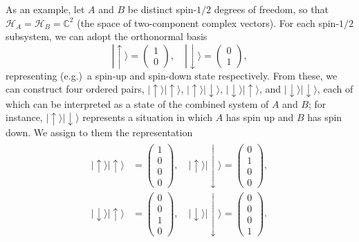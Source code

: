 \documentclass[prx,12pt]{revtex4-2}
\begin{document}
As an example, let $A$ and $B$ be distinct spin-$1/2$ degrees of
freedom, so that $\mathscr{H}_A = \mathscr{H}_B = \mathbb{C}^2$ (the
space of two-component complex vectors).  For each spin-$1/2$
subsystem, we can adopt the orthonormal basis
\begin{equation}
  |\!\uparrow\rangle = \begin{pmatrix}1 \\ 0 \end{pmatrix}, \quad
  |\!\downarrow\rangle = \begin{pmatrix}0 \\ 1 \end{pmatrix},
\end{equation}
representing (e.g.)~a spin-up and spin-down state respectively.  From
these, we can construct four ordered pairs, $|\!\uparrow\rangle
|\!\uparrow\rangle$, $|\!\uparrow\rangle |\!\downarrow\rangle$,
$|\!\downarrow\rangle |\!\uparrow\rangle$, and $|\!\downarrow\rangle
|\!\downarrow\rangle$, each of which can be interpreted as a state of
the combined system of $A$ and $B$; for instance, $|\!\uparrow\rangle
|\!\downarrow\rangle$ represents a situation in which $A$ has spin up
and $B$ has spin down.  We assign to them the representation
\begin{align}
  \begin{aligned}
  |\!\uparrow\rangle  |\!\uparrow\rangle
  &= \begin{pmatrix}1 \\ 0 \\ 0 \\ 0\end{pmatrix},\quad
  |\!\uparrow\rangle  |\!\downarrow\rangle
  = \begin{pmatrix}0 \\ 1 \\ 0 \\ 0\end{pmatrix}, \\
  |\!\downarrow\rangle  |\!\uparrow\rangle
  &= \begin{pmatrix}0 \\ 0 \\ 1 \\ 0\end{pmatrix},\quad
  |\!\downarrow\rangle  |\!\downarrow\rangle
  = \begin{pmatrix}0 \\ 0 \\ 0 \\ 1\end{pmatrix}.
  \end{aligned}
  \label{c4basis}
\end{align}
\end{document}
